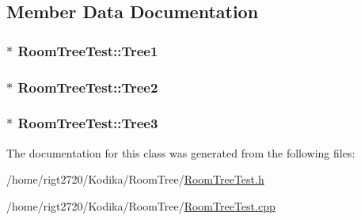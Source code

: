 \subsection{Member Data Documentation}
\hypertarget{classRoomTreeTest_aba5c37d20a82bff695de4c78a547f23f}{
\subsubsection[{Tree1}]{$\ast$ Room\-Tree\-Test\-::\-Tree1\hspace{0.3cm}{\ttfamily [private]}}}\label{classRoomTreeTest_aba5c37d20a82bff695de4c78a547f23f}
\hypertarget{classRoomTreeTest_aada805154b8f5306805936f0ba43834c}{
\subsubsection[{Tree2}]{$\ast$ Room\-Tree\-Test\-::\-Tree2\hspace{0.3cm}{\ttfamily [private]}}}\label{classRoomTreeTest_aada805154b8f5306805936f0ba43834c}
\hypertarget{classRoomTreeTest_aa70878ec1fa44e95f78e59a236572b27}{
\subsubsection[{Tree3}]{$\ast$ Room\-Tree\-Test\-::\-Tree3\hspace{0.3cm}{\ttfamily [private]}}}\label{classRoomTreeTest_aa70878ec1fa44e95f78e59a236572b27}


The documentation for this class was generated from the following files\-:\begin{DoxyCompactItemize}
\item 
/home/rigt2720/\-Kodika/\-Room\-Tree/\hyperlink{RoomTreeTest_8h}{Room\-Tree\-Test.\-h}\item 
/home/rigt2720/\-Kodika/\-Room\-Tree/\hyperlink{RoomTreeTest_8cpp}{Room\-Tree\-Test.\-cpp}\end{DoxyCompactItemize}
